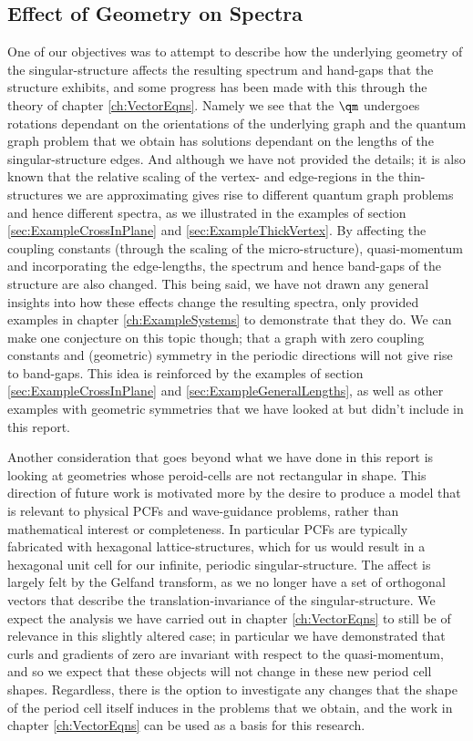 \subsection{Effect of Geometry on Spectra} \label{sec:ConcFutureGeometry}
One of our objectives was to attempt to describe how the underlying geometry of the singular-structure affects the resulting spectrum and hand-gaps that the structure exhibits, and some progress has been made with this through the theory of chapter \ref{ch:VectorEqns}.
Namely we see that the $\qm$ undergoes rotations dependant on the orientations of the underlying graph and the quantum graph problem that we obtain has solutions dependant on the lengths of the singular-structure edges.
And although we have not provided the details; it is also known that the relative scaling of the vertex- and edge-regions in the thin-structures we are approximating gives rise to different quantum graph problems and hence different spectra, as we illustrated in the examples of section \ref{sec:ExampleCrossInPlane} and \ref{sec:ExampleThickVertex}.
By affecting the coupling constants (through the scaling of the micro-structure), quasi-momentum and incorporating the edge-lengths, the spectrum and hence band-gaps of the structure are also changed.
This being said, we have not drawn any general insights into how these effects change the resulting spectra, only provided examples in chapter \ref{ch:ExampleSystems} to demonstrate that they do.
We can make one conjecture on this topic though; that a graph with zero coupling constants and (geometric) symmetry in the periodic directions will not give rise to band-gaps.
This idea is reinforced by the examples of section \ref{sec:ExampleCrossInPlane} and \ref{sec:ExampleGeneralLengths}, as well as other examples with geometric symmetries that we have looked at but didn't include in this report. \newline

Another consideration that goes beyond what we have done in this report is looking at geometries whose peroid-cells are not rectangular in shape.
This direction of future work is motivated more by the desire to produce a model that is relevant to physical PCFs and wave-guidance problems, rather than mathematical interest or completeness.
In particular PCFs are typically fabricated with hexagonal lattice-structures, which for us would result in a hexagonal unit cell for our infinite, periodic singular-structure.
The affect is largely felt by the Gelfand transform, as we no longer have a set of orthogonal vectors that describe the translation-invariance of the singular-structure.
We expect the analysis we have carried out in chapter \ref{ch:VectorEqns} to still be of relevance in this slightly altered case; in particular we have demonstrated that curls and gradients of zero are invariant with respect to the quasi-momentum, and so we expect that these objects will not change in these new period cell shapes.
Regardless, there is the option to investigate any changes that the shape of the period cell itself induces in the problems that we obtain, and the work in chapter \ref{ch:VectorEqns} can be used as a basis for this research.

